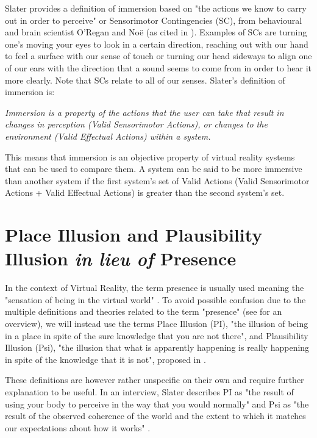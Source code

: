 Slater provides a definition of immersion based on "the actions we know to carry out in order to perceive" or Sensorimotor Contingencies (SC), from behavioural and brain scientist O'Regan and Noë (as cited in \parencite{Slater2009}). Examples of SCs are turning one's moving your eyes to look in a certain direction, reaching out with our hand to feel a surface with our sense of touch or turning our head sideways to align one of our ears with the direction that a sound seems to come from in order to hear it more clearly. Note that SCs relate to all of our senses. Slater's definition of immersion is:

\begin{displayquote}
\textit{Immersion is a property of the actions that the user can take that result in changes in perception (Valid Sensorimotor Actions), or changes to the environment (Valid Effectual Actions) within a system.} \parencite{Slater2009}
\end{displayquote}

This means that immersion is an objective property of virtual reality systems that can be used to compare them. A system can be said to be more immersive than another system if the first system's set of Valid Actions (Valid Sensorimotor Actions + Valid Effectual Actions) is greater than the second system's set.


\section{Place Illusion and Plausibility Illusion \textit{in lieu of} Presence}
\label{sec:PIandPsi}

In the context of Virtual Reality, the term presence is usually used meaning the "sensation of being in the virtual world" \parencite{Schuemie2001}. To avoid possible confusion due to the multiple definitions and theories related to the term "presence" (see \parencite{Schuemie2001} for an overview), we will instead use the terms Place Illusion (PI), "the illusion of being in a place in spite of the sure knowledge that you are not there", and Plausibility Illusion (Psi), "the illusion that what is apparently happening is really happening in spite of the knowledge that it is not", proposed in \parencite{Slater2009}.

These definitions are however rather unspecific on their own and require further explanation to be useful. In an interview, Slater describes PI as "the result of using your body to perceive in the way that you would normally" and Psi as "the result of the observed coherence of the world and the extent to which it matches our expectations about how it works" \parencite{Slater2015}.


